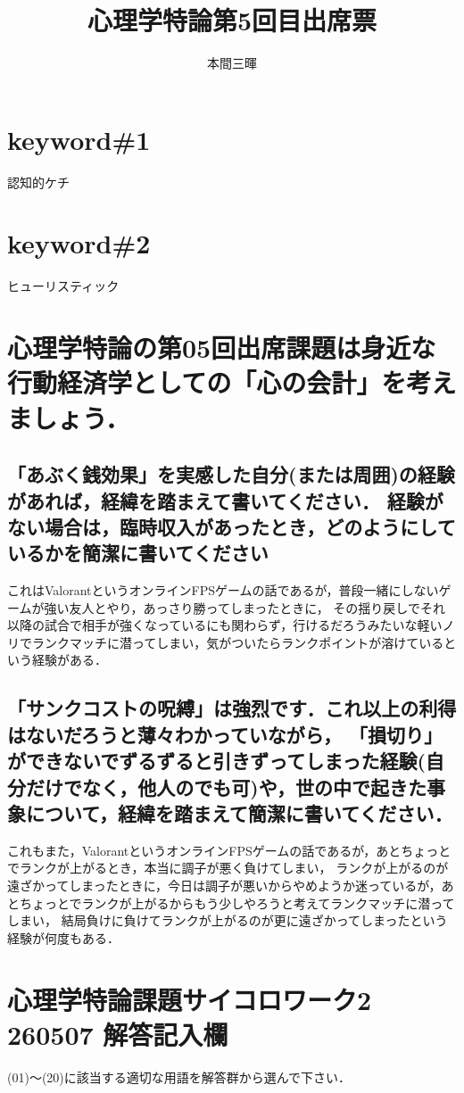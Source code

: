 \documentclass[titlepage,a4paper]{jsarticle}
\title{心理学特論第5回目出席票}
\author{本間三暉}
\begin{document}
\maketitle
\section*{keyword\#1}
認知的ケチ
\section*{keyword\#2}
ヒューリスティック

\section{心理学特論の第05回出席課題は身近な行動経済学としての「心の会計」を考えましょう．}
\subsection{「あぶく銭効果」を実感した自分(または周囲)の経験があれば，経緯を踏まえて書いてください．
経験がない場合は，臨時収入があったとき，どのようにしているかを簡潔に書いてください}
これはValorantというオンラインFPSゲームの話であるが，普段一緒にしないゲームが強い友人とやり，あっさり勝ってしまったときに，
その揺り戻しでそれ以降の試合で相手が強くなっているにも関わらず，行けるだろうみたいな軽いノリでランクマッチに潜ってしまい，気がついたらランクポイントが溶けているという経験がある．

\subsection{「サンクコストの呪縛」は強烈です．これ以上の利得はないだろうと薄々わかっていながら，
「損切り」ができないでずるずると引きずってしまった経験(自分だけでなく，他人のでも可)や，世の中で起きた事象について，経緯を踏まえて簡潔に書いてください．}
  これもまた，ValorantというオンラインFPSゲームの話であるが，あとちょっとでランクが上がるとき，本当に調子が悪く負けてしまい，
ランクが上がるのが遠ざかってしまったときに，今日は調子が悪いからやめようか迷っているが，あとちょっとでランクが上がるからもう少しやろうと考えてランクマッチに潜ってしまい，
結局負けに負けてランクが上がるのが更に遠ざかってしまったという経験が何度もある．

\section{心理学特論課題サイコロワーク2 260507 解答記入欄}
(01)～(20)に該当する適切な用語を解答群から選んで下さい．
\end{document}
